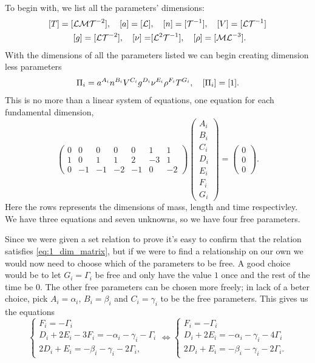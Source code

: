 \documentclass[11pt,letter, swedish, english
]{article}
\begin{document}
To begin with, we list all the parameters' dimensions:
\begin{equation}
\begin{aligned}
[T]=[\mathcal{LMT}^{-2}]\qcomma [a]=[\mathcal{L}]
&\qcomma [n]=[\mathcal{T}^{-1}]\qcomma [V]=[\mathcal{LT}^{-1}]\\
[g]=[\mathcal{LT}^{-2}]\qcomma [\nu]=&[\mathcal{L}^2\mathcal{T}^{-1}]
\qcomma  [\rho]=[\mathcal{ML}^{-3}].
\end{aligned}
\end{equation}
With the dimensions of all the parameters listed we can begin
creating dimension less parameters
\begin{equation}
\Pi_i = a^{A_i}n^{B_i} V^{C_i} g^{D_i} \nu^{E_i}\rho^{F_i} T^{G_i} \qcomma
[\Pi_i] = [1].
\end{equation}
This is no more than a linear system of equations, one equation for
each fundamental dimension,
\begin{equation}\label{eq:1_dim_matrix}
\begin{pmatrix}
0&0&0&0&0&1&1\\
1&0&1&1&2&-3&1\\
0&-1&-1&-2&-1&0&-2
\end{pmatrix}
\begin{pmatrix}
A_i\\B_i\\C_i\\D_i\\E_i\\F_i\\G_i
\end{pmatrix}
=\begin{pmatrix}
0\\0\\0
\end{pmatrix}.
\end{equation}
Here the rows represents the dimensions of mass, length and time respectivley.
We have three equations and seven unknowns, so we have four free
parameters. 

Since we were given a set relation to prove it's easy to confirm that
the relation satisfies \eqref{eq:1_dim_matrix}, but if we were to find
a relationship on our own we would now need to choose which of the
parameters to be free. A good choice would be to let $G_i=\Gamma_i$ be free and
only have the value $1$ once and the rest of the time be $0$. The
other free parameters can be chosen more freely; in lack of a beter
choice, pick $A_i=\alpha_i$, $B_i=\beta_i$ and $C_i=\gamma_i$ to be
the free parameters. 
This gives us the equations
\begin{equation}
\begin{cases}
F_i=-\Gamma_i\\
D_i+2E_i-3F_i=-\alpha_i-\gamma_i-\Gamma_i\\
2D_i+E_i=-\beta_i-\gamma_i-2\Gamma_i,
\end{cases}
\Longleftrightarrow
\begin{cases}
F_i=-\Gamma_i\\
D_i+2E_i=-\alpha_i-\gamma_i-4\Gamma_i\\
2D_i+E_i=-\beta_i-\gamma_i-2\Gamma_i.
\end{cases}
\end{equation}
\end{document}
